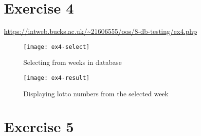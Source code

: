 \clearpage
\section{Exercise 4}

\url{https://intweb.bucks.ac.uk/~21606555/oos/8-db-testing/ex4.php}

\captionsetup{type=figure}


\begin{figure}[H]
  \caption{Selecting from weeks in database}
  \centering
  \texttt{[image: ex4-select]}
\end{figure}

\begin{figure}[H]
  \caption{Displaying lotto numbers from the selected week}
  \centering
  \texttt{[image: ex4-result]}
\end{figure}

\clearpage
\section{Exercise 5}
